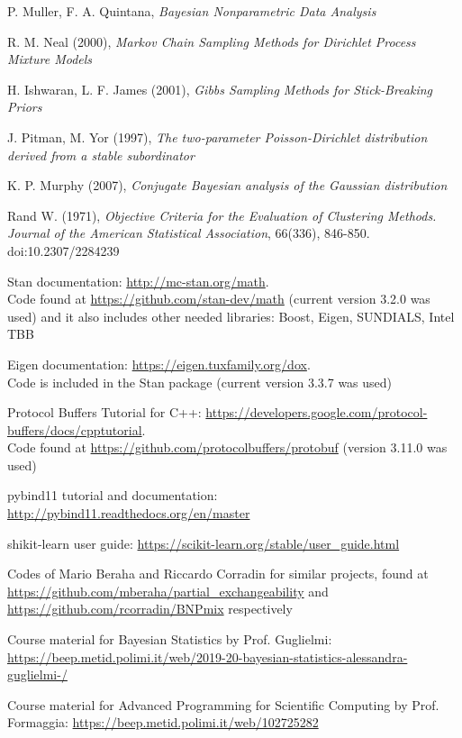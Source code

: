 \documentclass[a4paper]{report}
\begin{document}
\begin{thebibliography}{9}
	 P. Muller, F. A. Quintana, \textit{Bayesian Nonparametric Data Analysis}

	 R. M. Neal (2000), \textit{Markov Chain Sampling Methods for Dirichlet Process Mixture Models}

	 H. Ishwaran, L. F. James (2001), \textit{Gibbs Sampling Methods for Stick-Breaking Priors}

	 J. Pitman, M. Yor (1997), \textit{The two-parameter Poisson-Dirichlet distribution derived from a stable subordinator} 

	 K. P. Murphy (2007), \textit{Conjugate Bayesian analysis of the Gaussian distribution}

	 Rand W. (1971), \textit{Objective Criteria for the Evaluation of Clustering Methods.
	Journal of the American Statistical Association}, 66(336), 846-850. doi:10.2307/2284239

	 Stan documentation: \url{http://mc-stan.org/math}. \\
	Code found at \url{https://github.com/stan-dev/math} (current version 3.2.0 was used) and it also includes other needed libraries: Boost, Eigen, SUNDIALS, Intel TBB

	 Eigen documentation: \url{https://eigen.tuxfamily.org/dox}. \\
	Code is included in the Stan package (current version 3.3.7 was used)

	 Protocol Buffers Tutorial for C++: \url{https://developers.google.com/protocol-buffers/docs/cpptutorial}. \\
	Code found at \url{https://github.com/protocolbuffers/protobuf} (version 3.11.0 was used)

	 pybind11 tutorial and documentation: \url{http://pybind11.readthedocs.org/en/master}
	
	 shikit-learn user guide: \url{https://scikit-learn.org/stable/user_guide.html}

	 Codes of Mario Beraha and Riccardo Corradin for similar projects, found at \url{https://github.com/mberaha/partial_exchangeability} and \url{https://github.com/rcorradin/BNPmix} respectively

	 Course material for Bayesian Statistics by Prof. Guglielmi: \url{https://beep.metid.polimi.it/web/2019-20-bayesian-statistics-alessandra-guglielmi-/}
	
	 Course material for Advanced Programming for Scientific Computing by Prof. Formaggia:
	\url{https://beep.metid.polimi.it/web/102725282}
\end{thebibliography}
\end{document}
